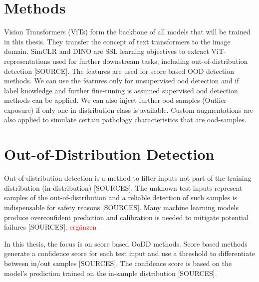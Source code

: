 \section{Methods}
Vision Transformers (ViTs) form the backbone of all models that will be trained in this thesis.
They transfer the concept of text transformers to the image domain.
SimCLR and DINO are SSL learning objectives to extract ViT-representations used for further downstream tasks, including out-of-distribution detection [SOURCE].
The features are used for score based OOD detection methods. 
We can use the features only for unsupervised ood detection and if label knowledge and further fine-tuning is assumed supervised ood detection methods can be applied.
We can also inject further ood samples (Outlier exposure) if only one in-distribution class is available. 
Custom augmentations are also applied to simulate certain pathology characteristics that are ood-samples.
\section{Out-of-Distribution Detection}
Out-of-distribution detection is a method to filter inputs not part of the training distribution (in-distribution) [SOURCES].
The unknown test inputs represent samples of the out-of-distribution and a reliable detection of such samples is indispensable for safety reasons [SOURCES].
Many machine learning models produce overconfident prediction and calibration is needed to mitigate potential failures [SOURCES].
\textcolor{red}{ergänzen}
\par
In this thesis, the focus is on score based OoDD methods.
Score based methods generate a confidence score for each test input and use a threshold to differentiate between in/out samples [SOURCES].
The confidence score is based on the model's prediction trained on the in-sample distribution [SOURCES].
